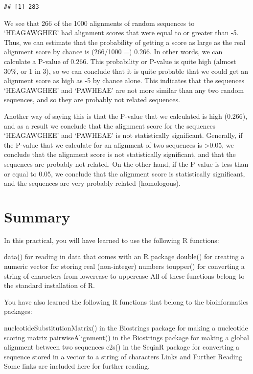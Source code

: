 \documentclass[
]{book}
\begin{document}
\begin{verbatim}
## [1] 283
\end{verbatim}

We see that 266 of the 1000 alignments of random sequences to `HEAGAWGHEE' had alignment scores that were equal to or greater than -5. Thus, we can estimate that the probability of getting a score as large as the real alignment score by chance is (266/1000 =) 0.266. In other words, we can calculate a P-value of 0.266. This probability or P-value is quite high (almost 30\%, or 1 in 3), so we can conclude that it is quite probable that we could get an alignment score as high as -5 by chance alone. This indicates that the sequences `HEAGAWGHEE' and `PAWHEAE' are not more similar than any two random sequences, and so they are probably not related sequences.

Another way of saying this is that the P-value that we calculated is high (0.266), and as a result we conclude that the alignment score for the sequences `HEAGAWGHEE' and `PAWHEAE' is not statistically significant. Generally, if the P-value that we calculate for an alignment of two sequences is \textgreater0.05, we conclude that the alignment score is not statistically significant, and that the sequences are probably not related. On the other hand, if the P-value is less than or equal to 0.05, we conclude that the alignment score is statistically significant, and the sequences are very probably related (homologous).

\hypertarget{summary-4}{%
\section{Summary}\label{summary-4}}

In this practical, you will have learned to use the following R functions:

data() for reading in data that comes with an R package
double() for creating a numeric vector for storing real (non-integer) numbers
toupper() for converting a string of characters from lowercase to uppercase
All of these functions belong to the standard installation of R.

You have also learned the following R functions that belong to the bioinformatics packages:

nucleotideSubstitutionMatrix() in the Biostrings package for making a nucleotide scoring matrix
pairwiseAlignment() in the Biostrings package for making a global alignment between two sequences
c2s() in the SeqinR package for converting a sequence stored in a vector to a string of characters
Links and Further Reading
Some links are included here for further reading.
\end{document}
